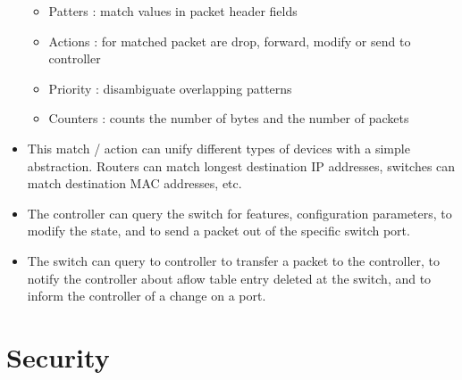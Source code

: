 \documentclass[]{article}
\providecommand{\tightlist}{%
  \setlength{\itemsep}{0pt}\setlength{\parskip}{0pt}}
\begin{document}
\begin{itemize}
  \begin{itemize}
  \tightlist
  \item
    Patters : match values in packet header fields
  \item
    Actions : for matched packet are drop, forward, modify or send to
    controller
  \item
    Priority : disambiguate overlapping patterns
  \item
    Counters : counts the number of bytes and the number of packets
  \end{itemize}
\item
  This match / action can unify different types of devices with a simple
  abstraction. Routers can match longest destination IP addresses,
  switches can match destination MAC addresses, etc.
\item
  The controller can query the switch for features, configuration
  parameters, to modify the state, and to send a packet out of the
  specific switch port.
\item
  The switch can query to controller to transfer a packet to the
  controller, to notify the controller about aflow table entry deleted
  at the switch, and to inform the controller of a change on a port.
\end{itemize}

\hypertarget{security}{%
\section{Security}\label{security}}
\end{document}
